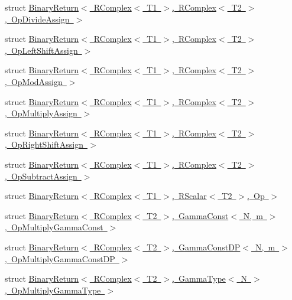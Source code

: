 \begin{DoxyCompactItemize}
\item 
struct \mbox{\hyperlink{structENSEM_1_1BinaryReturn_3_01RComplex_3_01T1_01_4_00_01RComplex_3_01T2_01_4_00_01OpDivideAssign_01_4}{Binary\+Return$<$ R\+Complex$<$ T1 $>$, R\+Complex$<$ T2 $>$, Op\+Divide\+Assign $>$}}
\item 
struct \mbox{\hyperlink{structENSEM_1_1BinaryReturn_3_01RComplex_3_01T1_01_4_00_01RComplex_3_01T2_01_4_00_01OpLeftShiftAssign_01_4}{Binary\+Return$<$ R\+Complex$<$ T1 $>$, R\+Complex$<$ T2 $>$, Op\+Left\+Shift\+Assign $>$}}
\item 
struct \mbox{\hyperlink{structENSEM_1_1BinaryReturn_3_01RComplex_3_01T1_01_4_00_01RComplex_3_01T2_01_4_00_01OpModAssign_01_4}{Binary\+Return$<$ R\+Complex$<$ T1 $>$, R\+Complex$<$ T2 $>$, Op\+Mod\+Assign $>$}}
\item 
struct \mbox{\hyperlink{structENSEM_1_1BinaryReturn_3_01RComplex_3_01T1_01_4_00_01RComplex_3_01T2_01_4_00_01OpMultiplyAssign_01_4}{Binary\+Return$<$ R\+Complex$<$ T1 $>$, R\+Complex$<$ T2 $>$, Op\+Multiply\+Assign $>$}}
\item 
struct \mbox{\hyperlink{structENSEM_1_1BinaryReturn_3_01RComplex_3_01T1_01_4_00_01RComplex_3_01T2_01_4_00_01OpRightShiftAssign_01_4}{Binary\+Return$<$ R\+Complex$<$ T1 $>$, R\+Complex$<$ T2 $>$, Op\+Right\+Shift\+Assign $>$}}
\item 
struct \mbox{\hyperlink{structENSEM_1_1BinaryReturn_3_01RComplex_3_01T1_01_4_00_01RComplex_3_01T2_01_4_00_01OpSubtractAssign_01_4}{Binary\+Return$<$ R\+Complex$<$ T1 $>$, R\+Complex$<$ T2 $>$, Op\+Subtract\+Assign $>$}}
\item 
struct \mbox{\hyperlink{structENSEM_1_1BinaryReturn_3_01RComplex_3_01T1_01_4_00_01RScalar_3_01T2_01_4_00_01Op_01_4}{Binary\+Return$<$ R\+Complex$<$ T1 $>$, R\+Scalar$<$ T2 $>$, Op $>$}}
\item 
struct \mbox{\hyperlink{structENSEM_1_1BinaryReturn_3_01RComplex_3_01T2_01_4_00_01GammaConst_3_01N_00_01m_01_4_00_01OpMultiplyGammaConst_01_4}{Binary\+Return$<$ R\+Complex$<$ T2 $>$, Gamma\+Const$<$ N, m $>$, Op\+Multiply\+Gamma\+Const $>$}}
\item 
struct \mbox{\hyperlink{structENSEM_1_1BinaryReturn_3_01RComplex_3_01T2_01_4_00_01GammaConstDP_3_01N_00_01m_01_4_00_01OpMultiplyGammaConstDP_01_4}{Binary\+Return$<$ R\+Complex$<$ T2 $>$, Gamma\+Const\+D\+P$<$ N, m $>$, Op\+Multiply\+Gamma\+Const\+D\+P $>$}}
\item 
struct \mbox{\hyperlink{structENSEM_1_1BinaryReturn_3_01RComplex_3_01T2_01_4_00_01GammaType_3_01N_01_4_00_01OpMultiplyGammaType_01_4}{Binary\+Return$<$ R\+Complex$<$ T2 $>$, Gamma\+Type$<$ N $>$, Op\+Multiply\+Gamma\+Type $>$}}

\end{DoxyCompactItemize}
